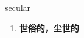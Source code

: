 
\begin{frame}
{\huge secular}
\begin{center}
\begin{enumerate}\Large
  \item \textbf{世俗的，尘世的}
\end{enumerate}
\end{center}
\end{frame}
